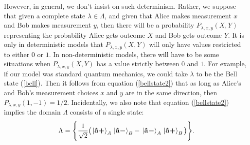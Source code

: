 However, in general, we don't insist on such determinism. Rather, we suppose that given a complete state $\lambda\in\Lambda$, and given that Alice makes measurement $x$ and Bob makes measurement $y$, then there will be a probability $P_{\lambda,x,y}(X , Y)$ representing the probability Alice gets outcome $X$ and Bob gets outcome $Y$. It is only in deterministic models that $P_{\lambda,x,y}(X , Y)$ will only have values restricted to either $0$ or $1$. In non-deterministic models, there will have to be some situations when $P_{\lambda,x,y}(X, Y)$ has a value strictly between $0$ and $1$. For example, if our model was standard quantum mechanics, we could take $\lambda$ to be the Bell state (\ref{bell}). Then it follows from equation (\ref{bellstate2}) that as long as Alice's and Bob's measurement choices $x$ and $y$ are in the same direction, then $P_{\lambda,x,y}(1,-1)=1/2$. Incidentally, we also note that equation (\ref{bellstate2}) implies the domain $\Lambda$ consists of a single state:
\begin{equation}\label{quantumLambda}
\Lambda=\Bigg\{\frac{1}{\sqrt{2}}\big(\ket*{\vb{\hat{{a}}}\bm{+}}_A\ket*{\vb{\hat{{a}}}\bm{-}}_B-\ket*{\vb{\hat{{a}}}\bm{-}}_A\ket*{\vb{\hat{{a}}}\bm{+}}_B\big)\Bigg\}.
\end{equation}

